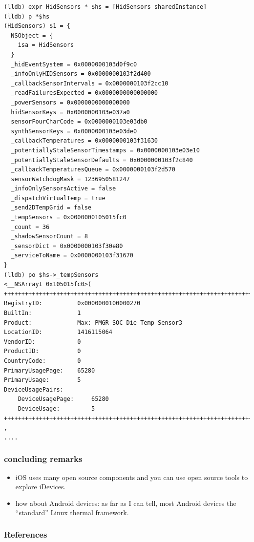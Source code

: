 \documentclass{beamer}
\begin{document}
\begin{frame}
  \begin{lstlisting}[basicstyle=\tiny,caption=''HidSensors'',label=HidSensors]
(lldb) expr HidSensors * $hs = [HidSensors sharedInstance]
(lldb) p *$hs
(HidSensors) $1 = {
  NSObject = {
    isa = HidSensors
  }
  _hidEventSystem = 0x0000000103d0f9c0
  _infoOnlyHIDSensors = 0x0000000103f2d400
  _callbackSensorIntervals = 0x0000000103f2cc10
  _readFailuresExpected = 0x0000000000000000
  _powerSensors = 0x0000000000000000
  hidSensorKeys = 0x0000000103e037a0
  sensorFourCharCode = 0x0000000103e03db0
  synthSensorKeys = 0x0000000103e03de0
  _callbackTemperatures = 0x0000000103f31630
  _potentiallyStaleSensorTimestamps = 0x0000000103e03e10
  _potentiallyStaleSensorDefaults = 0x0000000103f2c840
  _callbackTemperaturesQueue = 0x0000000103f2d570
  sensorWatchdogMask = 1236950581247
  _infoOnlySensorsActive = false
  _dispatchVirtualTemp = true
  _send2DTempGrid = false
  _tempSensors = 0x0000000105015fc0
  _count = 36
  _shadowSensorCount = 8
  _sensorDict = 0x0000000103f30e80
  _serviceToName = 0x0000000103f31670
}
(lldb) po $hs->_tempSensors
<__NSArrayI 0x105015fc0>(
+++++++++++++++++++++++++++++++++++++++++++++++++++++++++++++++++++++++++++
RegistryID:          0x0000000100000270
BuiltIn:             1
Product:             Max: PMGR SOC Die Temp Sensor3
LocationID:          1416115064
VendorID:            0
ProductID:           0
CountryCode:         0
PrimaryUsagePage:    65280
PrimaryUsage:        5
DeviceUsagePairs:   
    DeviceUsagePage:     65280
    DeviceUsage:         5
+++++++++++++++++++++++++++++++++++++++++++++++++++++++++++++++++++++++++++
,
....    
  \end{lstlisting}
\end{frame}

\begin{frame}
  \frametitle{concluding remarks}
  \begin{itemize}
  \item iOS uses many open source components and you can use open source tools to explore iDevices.
  \item how about Android devices: as far as I can tell, most Android devices the ``standard'' Linux thermal framework.
  \end{itemize}
\end{frame}

\begin{frame}
  \frametitle{References}
  \tiny
  
  
\end{frame}
\end{document}
